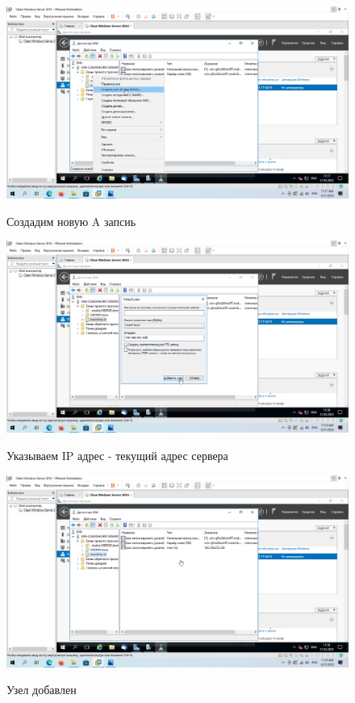 \documentclass[a4paper]{article}
\begin{document}
  \begin{figure}[H]
    \centering
    \includegraphics[width=\textwidth]{11_0079}
    \label{img:79}
    \caption{Создадим новую A запсиь}
  \end{figure}

  \begin{figure}[H]
    \centering
    \includegraphics[width=\textwidth]{11_0088}
    \label{img:88}
    \caption{Указываем IP адрес - текущий адрес сервера}
  \end{figure}

  \begin{figure}[H]
    \centering
    \includegraphics[width=\textwidth]{11_0089}
    \label{img:89}
    \caption{Узел добавлен}
  \end{figure}
\end{document}
